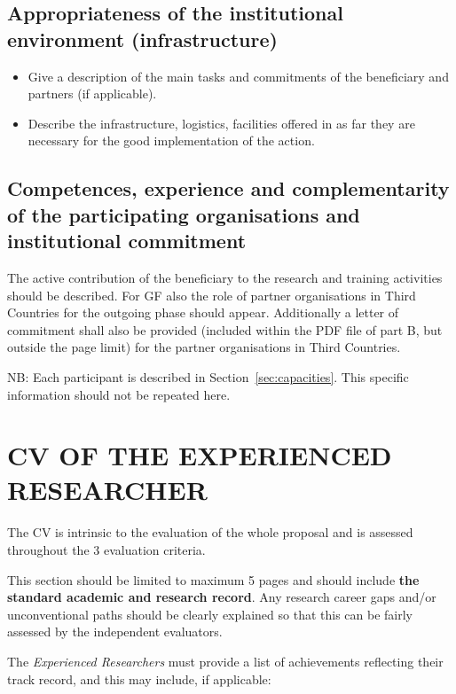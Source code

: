 \documentclass[a4paper,11pt]{article}
\begin{document}
\subsection{Appropriateness of the institutional environment (infrastructure)}
\label{sec:institution}

\begin{itemize}
\item Give a description of the main tasks and commitments of the beneficiary and partners (if applicable). 
\item Describe the infrastructure, logistics, facilities offered in as far they are necessary for the good implementation of the action.  
\end{itemize}

\subsection{Competences, experience and complementarity of the participating organisations and institutional commitment}
\label{sec:competences}

The active contribution of the beneficiary to the research and training activities should be described. For GF also the role of partner organisations in Third Countries for the outgoing phase should appear. Additionally a letter of commitment shall also be provided (included within the PDF file of part B, but outside the page limit) for the partner organisations in Third Countries.

NB: Each participant is described in Section~\ref{sec:capacities}. This specific information should not be repeated here.


\newpage
\section{CV OF THE EXPERIENCED RESEARCHER}
\label{sec:cv}

The CV is intrinsic to the evaluation of the whole proposal and is assessed throughout the 3 evaluation criteria.

This section should be limited to maximum 5 pages and should include \textbf{the standard academic and research record}. Any research career gaps and/or unconventional paths should be clearly explained so that this can be fairly assessed by the independent evaluators.

The \emph{Experienced Researchers} must provide a list of achievements reflecting their track record, and this may include, if applicable:
\end{document}
